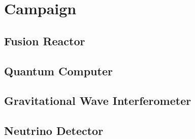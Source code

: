 \documentclass[a4paper]{article}
\begin{document}
\def\qeq#1#2#3#4#5#6#7#8#9{#1 ? 
\vspace*{-0.4cm} \begin{enumerate}[leftmargin=2cm]
\item [#2] #3 

\if#4%
\else
\item [#4] #5
\fi

\if#6%
\else
\item [#6] #7
\fi

\if#8%
\else
\item [#8] #9
\fi
\end{enumerate}}

\def\pbhw#1#2{
\begin{tabular}[t]{r p{14cm}}
\textit{Physical} - & #1 \\
\textit{Heating} - & #2 \\
\end{tabular}}


\section{Campaign}

\subsection{Fusion Reactor}

\subsection{Quantum Computer}

\subsection{Gravitational Wave Interferometer}

\subsection{Neutrino Detector}
\end{document}
